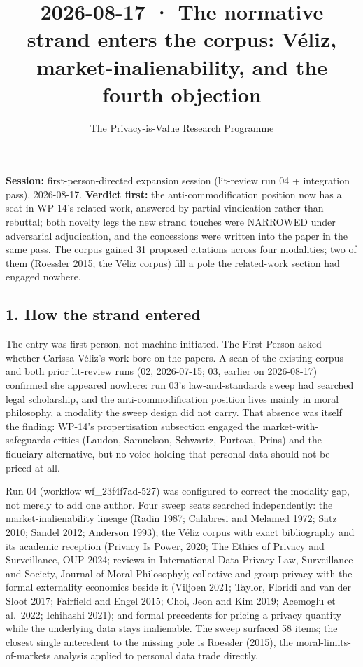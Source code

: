 \documentclass[
  11pt,
]{article}
\title{2026-08-17 · The normative strand enters the corpus: Véliz,
market-inalienability, and the fourth objection}
\author{The Privacy-is-Value Research Programme}
\date{}
\begin{document}
\maketitle

\textbf{Session:} first-person-directed expansion session (lit-review
run 04 + integration pass), 2026-08-17. \textbf{Verdict first:} the
anti-commodification position now has a seat in WP-14's related work,
answered by partial vindication rather than rebuttal; both novelty legs
the new strand touches were NARROWED under adversarial adjudication, and
the concessions were written into the paper in the same pass. The corpus
gained 31 proposed citations across four modalities; two of them
(Roessler 2015; the Véliz corpus) fill a pole the related-work section
had engaged nowhere.

\subsection{1. How the strand entered}\label{how-the-strand-entered}

The entry was first-person, not machine-initiated. The First Person
asked whether Carissa Véliz's work bore on the papers. A scan of the
existing corpus and both prior lit-review runs (02, 2026-07-15; 03,
earlier on 2026-08-17) confirmed she appeared nowhere: run 03's
law-and-standards sweep had searched legal scholarship, and the
anti-commodification position lives mainly in moral philosophy, a
modality the sweep design did not carry. That absence was itself the
finding: WP-14's propertisation subsection engaged the
market-with-safeguards critics (Laudon, Samuelson, Schwartz, Purtova,
Prins) and the fiduciary alternative, but no voice holding that personal
data should not be priced at all.

Run 04 (workflow wf\_23f4f7ad-527) was configured to correct the
modality gap, not merely to add one author. Four sweep seats searched
independently: the market-inalienability lineage (Radin 1987; Calabresi
and Melamed 1972; Satz 2010; Sandel 2012; Anderson 1993); the Véliz
corpus with exact bibliography and its academic reception (Privacy Is
Power, 2020; The Ethics of Privacy and Surveillance, OUP 2024; reviews
in International Data Privacy Law, Surveillance and Society, Journal of
Moral Philosophy); collective and group privacy with the formal
externality economics beside it (Viljoen 2021; Taylor, Floridi and van
der Sloot 2017; Fairfield and Engel 2015; Choi, Jeon and Kim 2019;
Acemoglu et al.~2022; Ichihashi 2021); and formal precedents for pricing
a privacy quantity while the underlying data stays inalienable. The
sweep surfaced 58 items; the closest single antecedent to the missing
pole is Roessler (2015), the moral-limits-of-markets analysis applied to
personal data trade directly.
\end{document}

